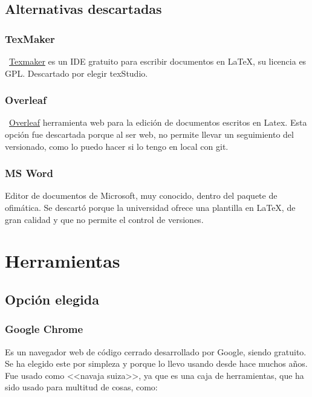 \subsection{Alternativas descartadas}

\subsubsection{TexMaker}\label{textmaker}
~\href{https://www.xm1math.net/texmaker/}{Texmaker} es un IDE gratuito para escribir documentos en \LaTeX{}, su licencia es GPL. Descartado por elegir texStudio.

\subsubsection{Overleaf}
~\href{https://www.overleaf.com/}{Overleaf} herramienta web para la edición de documentos escritos en Latex. Esta opción fue descartada porque al ser web, no permite llevar un seguimiento del versionado, como lo puedo hacer si lo tengo en local con git.

\subsubsection{MS Word}
Editor de documentos de Microsoft, muy conocido, dentro del paquete de ofimática. Se descartó porque la universidad ofrece una plantilla en \LaTeX{}, de gran calidad y que no permite el control de versiones.

\section{Herramientas}

\subsection{Opción elegida}

\subsubsection{Google Chrome}
Es un navegador web de código cerrado desarrollado por Google, siendo gratuito. Se ha elegido este por simpleza y porque lo llevo usando desde hace muchos años. Fue usado como <<navaja suiza>>, ya que es una caja de herramientas, que ha sido usado para multitud de cosas, como:

